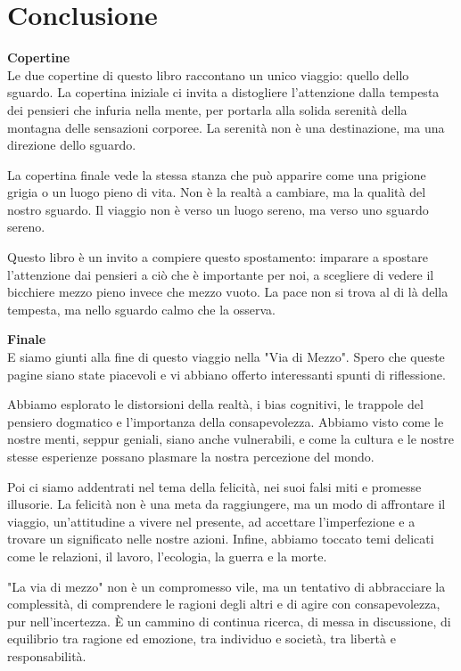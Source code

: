 \documentclass[12pt]{book} %
\begin{document}
\clearpage\section{Conclusione}

\noindent \textbf{\large Copertine} \\

Le due copertine di questo libro raccontano un unico viaggio: quello dello sguardo.
La copertina iniziale ci invita a distogliere l'attenzione dalla tempesta dei pensieri che infuria nella mente, per portarla alla solida serenità della montagna delle sensazioni corporee.
La serenità non è una destinazione, ma una direzione dello sguardo.

La copertina finale vede la stessa stanza che può apparire come una prigione grigia o un luogo pieno di vita. Non è la realtà a cambiare, ma la qualità del nostro sguardo.
Il viaggio non è verso un luogo sereno, ma verso uno sguardo sereno.

Questo libro è un invito a compiere questo spostamento: imparare a spostare l'attenzione dai pensieri a ciò che è importante per noi, a scegliere di vedere il bicchiere mezzo pieno invece che mezzo vuoto. 
La pace non si trova al di là della tempesta, ma nello sguardo calmo che la osserva.

\noindent \textbf{\large Finale} \\

E siamo giunti alla fine di questo viaggio nella "Via di Mezzo". Spero che queste pagine siano state piacevoli e vi abbiano offerto interessanti spunti di riflessione.

Abbiamo esplorato le distorsioni della realtà, i bias cognitivi, le trappole del pensiero dogmatico e l'importanza della consapevolezza. Abbiamo visto come le nostre menti, seppur geniali, siano anche vulnerabili, e come la cultura e le nostre stesse esperienze possano plasmare la nostra percezione del mondo.

Poi ci siamo addentrati nel tema della felicità, nei suoi falsi miti e promesse illusorie. La felicità non è una meta da raggiungere, ma un modo di affrontare il viaggio, un'attitudine a vivere nel presente, ad accettare l'imperfezione e a trovare un significato nelle nostre azioni.
Infine, abbiamo toccato temi delicati come le relazioni, il lavoro, l'ecologia, la guerra e la morte.

"La via di mezzo" non è un compromesso vile, ma un tentativo di abbracciare la complessità, di comprendere le ragioni degli altri e di agire con consapevolezza, pur nell'incertezza. È un cammino di continua ricerca, di messa in discussione, di equilibrio tra ragione ed emozione, tra individuo e società, tra libertà e responsabilità.
\end{document}
